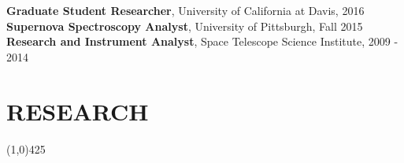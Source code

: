 \documentclass{res}
\begin{document}
\begin{resume}
    {\bf Graduate Student Researcher}, University of California at Davis, 2016 \\
    {\bf Supernova Spectroscopy Analyst}, University of Pittsburgh, Fall 2015 \\
    {\bf Research and Instrument Analyst}, Space Telescope Science Institute, 2009 - 2014 \\   
    
\section{RESEARCH} 
\vspace{-.2in}
\begin{center}
\line(1,0){425}
\end{center}
\vspace{-.3in}
\vspace{0.1in}


\end{resume}
\end{document}
